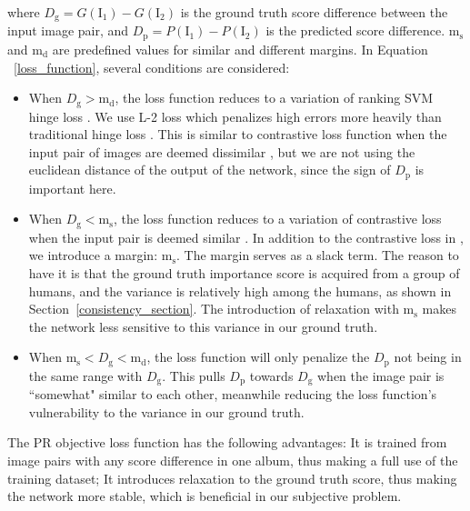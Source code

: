 \documentclass[10pt,twocolumn,letterpaper]{article}
\begin{document}
where  $D_\text{g} = G(\text{I}_{1})-G(\text{I}_{2})$ is the ground truth score difference between the input image pair, and  $D_\text{p} = P(\text{I}_{1})-P(\text{I}_{2})$ is the predicted score difference. $\text{m}_\text{s}$ and $\text{m}_\text{d}$ are predefined values for similar and different margins. In Equation ~\ref{loss_function}, several conditions are considered:

\begin{itemize}
  \item When $D_\text{g}  > \text{m}_\text{d}$, the loss function reduces to a variation of ranking SVM hinge loss \cite{ranking_loss}. We use L-2 loss which penalizes high errors more heavily than traditional hinge loss \cite{svm}. This is similar to contrastive loss function when the input pair of images are deemed dissimilar \cite{contrastive}, but we are not using the euclidean distance of the output of the network, since the sign of $D_\text{p}$ is important here. 
  \item When $D_\text{g} < \text{m}_\text{s}$, the loss function reduces to a variation of contrastive loss when the input pair is deemed similar \cite{contrastive}. In addition to the contrastive loss in \cite{contrastive}, we introduce a margin: $ \text{m}_\text{s}$. The margin serves as a slack term. The reason to have it is that the ground truth importance score is acquired from a group of humans, and the variance is relatively high among the humans, as shown in Section~\ref{consistency_section}. The introduction of relaxation with $\text{m}_\text{s}$ makes the network less sensitive to this variance in our ground truth.
  \item When $\text{m}_\text{s} < D_\text{g}  < \text{m}_\text{d}$, the loss function will only penalize the $D_\text{p}$ not being in the same range with $D_\text{g}$. This pulls $D_\text{p}$ towards $D_\text{g}$ when the image pair is ``somewhat" similar to each other, meanwhile reducing the loss function's vulnerability to the variance in our ground truth.
\end{itemize}
The PR objective loss function has the following advantages: It is trained from image pairs with any score difference in one album, thus making a full use of the training dataset; It introduces relaxation to the ground truth score, thus making the network more stable, which is beneficial in our subjective problem.
\end{document}
